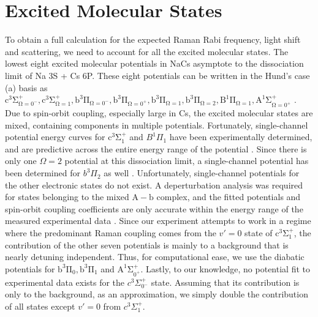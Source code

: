 \documentclass[aps,secnumarabic,amsmath,amssymb,10pt,superscriptaddress]{revtex4}
\begin{document}
\section{Excited Molecular States} \label{sm:excited_states}
To obtain a full calculation for the expected Raman Rabi frequency, light shift and scattering, we need to account for all the excited molecular states.
The lowest eight excited molecular potentials in NaCs asymptote to the dissociation limit of Na 3S + Cs 6P.
These eight potentials can be written in the Hund's case (a) basis as $ \mathrm{c^3\Sigma^+_{\Omega = 0^-},c^3\Sigma^+_{\Omega = 1}, b^3\Pi_{\Omega = 0^-}, b^3\Pi_{\Omega = 0^+}, b^3\Pi_{\Omega = 1}, b^3\Pi_{\Omega = 2}, B^1\Pi_{\Omega = 1}, A^1\Sigma^+_{\Omega = 0^+}}$ \cite{Korek2007}.
Due to spin-orbit coupling, especially large in Cs, the excited molecular states are mixed, containing components in multiple potentials.
Fortunately, single-channel potential energy curves for $\mathrm{c^3\Sigma^+_1}$ and $  B^1\Pi_1 $ have been experimentally determined, and are predictive across the entire energy range of the potential \cite{Grochola2010, Grochola2011, Liu2017}.
Since there is only one $ \Omega = 2$ potential at this dissociation limit, a single-channel potential has been determined for $ b^3\Pi_2$ as well \cite{Zabawa2012}.
Unfortunately, single-channel potentials for the other electronic states do not exist.
A deperturbation analysis was required for states belonging to the mixed $\mathrm{A-b}$ complex,
and the fitted potentials and spin-orbit coupling coefficients are only accurate within the energy range of the measured experimental data \cite{Zaharova2009}.
Since our experiment attempts to work in a regime where the predominant Raman coupling comes from the $v' = 0$ state of $ \mathrm{c^3\Sigma^+_1} $,
the contribution of the other seven potentials is mainly to a background that is nearly detuning independent.
Thus, for computational ease, we use the diabatic potentials for $ \mathrm{b^3\Pi_{0}, b^3\Pi_{1}} $ and $ \mathrm{A^1\Sigma^+_{0^+}}$.
Lastly, to our knowledge, no potential fit to experimental data exists for the $ c^3\Sigma^+_{0^-}$ state. Assuming that its contribution is only to the background, as an approximation, we simply double the contribution of all states except $v' = 0$ from $ c^3\Sigma^+_1$.
\end{document}
